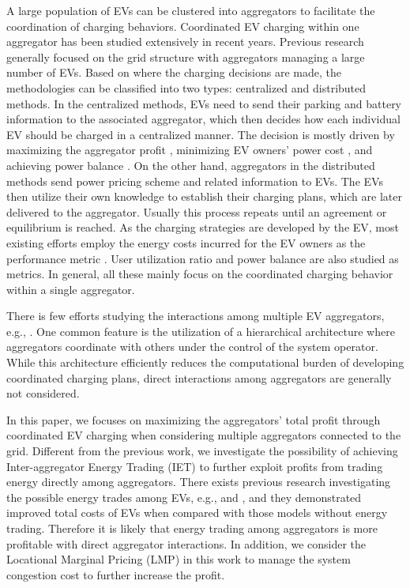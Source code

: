 \documentclass[conference]{IEEEtran}
\begin{document}
A large population of EVs can be clustered into aggregators to facilitate the coordination of charging behaviors. 
Coordinated EV charging within one aggregator has been studied extensively in recent years. Previous research generally focused on the grid structure with aggregators managing a large number of EVs. Based on where the charging decisions are made, the methodologies can be classified into two types: centralized and distributed methods. In the centralized methods, EVs need to send their parking and battery information to the associated aggregator, which then decides how each individual EV should be charged in a centralized manner. The decision is mostly driven by maximizing the aggregator profit \cite{Han2010,Sortomme2011}, minimizing EV owners' power cost \cite{Wu2012,Vandael2015}, and achieving power balance \cite{Hoog2015}. On the other hand, aggregators in the distributed methods send power pricing scheme and related information to EVs. The EVs then utilize their own knowledge to establish their charging plans, which are later delivered to the aggregator. Usually this process repeats until an agreement or equilibrium is reached. As the charging strategies are developed by the EV, most existing efforts employ the energy costs incurred for the EV owners as the performance metric \cite{He2012}. User utilization ratio \cite{Wen2012} and power balance \cite{Gan2013} are also studied as metrics. In general, all these mainly focus on the coordinated charging behavior within a single aggregator.
	
There is few efforts studying the interactions among multiple EV aggregators, e.g., \cite{Qi2014,Shao2016}. One common feature is the utilization of a hierarchical architecture where aggregators coordinate with others under the control of the system operator. While this architecture efficiently reduces the computational burden of developing coordinated charging plans, direct interactions among aggregators are generally not considered.

    In this paper, we focuses on maximizing the aggregators' total profit through coordinated EV charging when considering multiple aggregators connected to the grid. Different from the previous work, we investigate the possibility of achieving Inter-aggregator Energy Trading (IET) to further exploit profits from trading energy directly among aggregators. There exists previous research investigating the possible energy trades among EVs, e.g., \cite{Wu2012a} and \cite{Kim2013}, and they demonstrated improved total costs of EVs when compared with those models without energy trading. Therefore it is likely that energy trading among aggregators is more profitable with direct aggregator interactions. In addition, we consider the Locational Marginal Pricing (LMP) in this work to manage the system congestion cost to further increase the profit.
    
\end{document}
